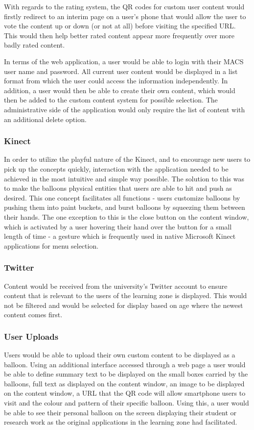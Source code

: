With regards to the rating system, the QR codes for custom user content would firstly redirect to an interim page on a user's phone that would allow the user to vote the content up or down (or not at all) before visiting the specified URL. This would then help better rated content appear more frequently over more badly rated content.

In terms of the web application, a user would be able to login with their MACS user name and password. All current user content would be displayed in a list format from which the user could access the information independently. In addition, a user would then be able to create their own content, which would then be added to the custom content system for possible selection. The administrative side of the application would only require the list of content with an additional delete option.

\subsubsection{Kinect}
In order to utilize the playful nature of the Kinect, and to encourage new users to pick up the concepts quickly, interaction with the application needed to be achieved in the most intuitive and simple way possible. The solution to this was to make the balloons physical entities that users are able to hit and push as desired. This one concept facilitates all functions - users customize balloons by pushing them into paint buckets, and burst balloons by squeezing them between their hands. The one exception to this is the close button on the content window, which is activated by a user hovering their hand over the button for a small length of time - a gesture which is frequently used in native Microsoft Kinect applications for menu selection.

\subsubsection{Twitter}
Content would be received from the university's Twitter account to ensure content that is relevant to the users of the learning zone is displayed. This would not be filtered and would be selected for display based on age where the newest content comes first.

\subsubsection{User Uploads}
Users would be able to upload their own custom content to be displayed as a balloon. Using an additional interface accessed through a web page a user would be able to define summary text to be displayed on the small boxes carried by the balloons, full text as displayed on the content window, an image to be displayed on the content window, a URL that the QR code will allow smartphone users to visit and the colour and pattern of their specific balloon. Using this, a user would be able to see their personal balloon on the screen displaying their student or research work as the original applications in the learning zone had facilitated.

